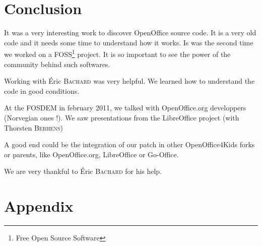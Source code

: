 \documentclass[a4paper,11pt]{article}
\begin{document}
\section*{Conclusion}

It was a very interesting work to discover OpenOffice source code. It is a very
old code and it needs some time to understand how it works. Is was the second
time we worked on a FOSS\footnote{Free Open Source Software} project. It is so
important to see the power of the community behind such softwares. 

Working with Éric \textsc{Bachard} was very helpful. We learned how to
understand the code in good conditions.

At the FOSDEM in february 2011, we talked with OpenOffice.org developpers
(Norvegian ones !). We saw presentations from the LibreOffice project (with
Thorsten \textsc{Berhens})

A good end could be the integration of our patch in other OpenOffice4Kids
forks or parents, like OpenOffice.org, LibreOffice or Go-Office.

We are very thankful to Éric \textsc{Bachard} for his help.

\newpage
{}
\listoffigures

\newpage
{}
\section*{Appendix}
\end{document}
